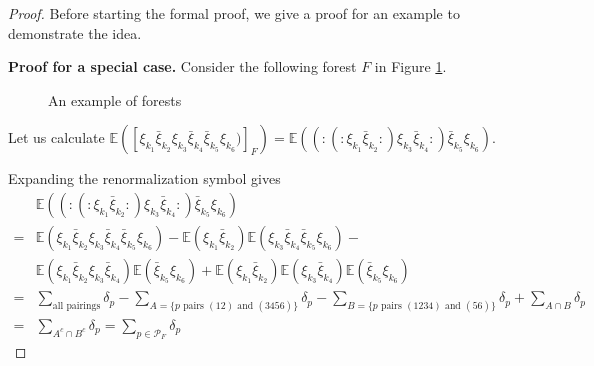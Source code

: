 \begin{proof} Before starting the formal proof, we give a proof for an example to demonstrate the idea.
    
\textbf{Proof for a special case.} Consider the following forest $F$ in Figure \ref{fig.forestexample}.

\begin{figure}[H]
    \centering
    \caption{An example of forests}
    \label{fig.forestexample}
\end{figure}

Let us calculate $\mathbb{E}([\xi_{k_1}\bar{\xi}_{k_2}\xi_{k_3}\bar{\xi}_{k_4}\bar{\xi}_{k_5}\xi_{k_6})]_{F})=\mathbb{E}((:(:\xi_{k_1}\bar{\xi}_{k_2}:)\xi_{k_3}\bar{\xi}_{k_4}:)\bar{\xi}_{k_5}\xi_{k_6})$.

Expanding the renormalization symbol gives
\begin{equation}
    \begin{split}
        &\mathbb{E}((:(:\xi_{k_1}\bar{\xi}_{k_2}:)\xi_{k_3}\bar{\xi}_{k_4}:)\bar{\xi}_{k_5}\xi_{k_6})
        \\
        =&\mathbb{E}(\xi_{k_1}\bar{\xi}_{k_2}\xi_{k_3}\bar{\xi}_{k_4}\bar{\xi}_{k_5}\xi_{k_6})-\mathbb{E}(\xi_{k_1}\bar{\xi}_{k_2})\mathbb{E}( \xi_{k_3}\bar{\xi}_{k_4}\bar{\xi}_{k_5}\xi_{k_6})-
        \\
        &\mathbb{E}(\xi_{k_1}\bar{\xi}_{k_2}\xi_{k_3}\bar{\xi}_{k_4})\mathbb{E}( \bar{\xi}_{k_5}\xi_{k_6}) + \mathbb{E}(\xi_{k_1}\bar{\xi}_{k_2})\mathbb{E}(\xi_{k_3}\bar{\xi}_{k_4})\mathbb{E}( \bar{\xi}_{k_5}\xi_{k_6})
        \\
        =&\sum_{\text{all pairings}} \delta_p - \sum_{A=\{p \text{ pairs } (12)\text{ and }(3456)\}} \delta_p-\sum_{B = \{p \text{ pairs } (1234)\text{ and }(56)\}} \delta_p+\sum_{A\cap B} \delta_p
        \\
        = & \sum_{A^c\cap B^c} \delta_p = \sum_{p\in \mathcal{P}_F} \delta_p
    \end{split}
\end{equation}


\end{proof}
